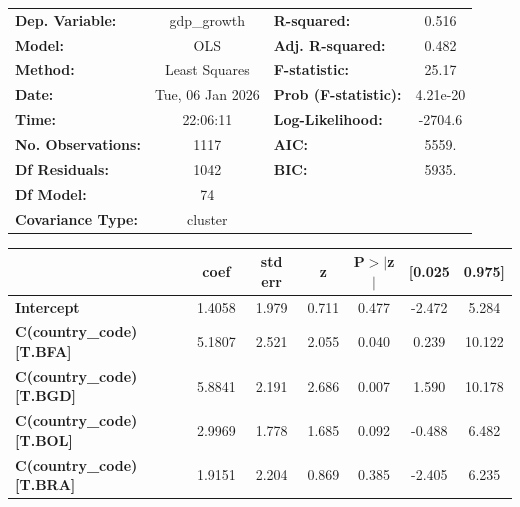\begin{center}
\begin{tabular}{lclc}
\toprule
\textbf{Dep. Variable:}          &   gdp\_growth    & \textbf{  R-squared:         } &     0.516   \\
\textbf{Model:}                  &       OLS        & \textbf{  Adj. R-squared:    } &     0.482   \\
\textbf{Method:}                 &  Least Squares   & \textbf{  F-statistic:       } &     25.17   \\
\textbf{Date:}                   & Tue, 06 Jan 2026 & \textbf{  Prob (F-statistic):} &  4.21e-20   \\
\textbf{Time:}                   &     22:06:11     & \textbf{  Log-Likelihood:    } &   -2704.6   \\
\textbf{No. Observations:}       &        1117      & \textbf{  AIC:               } &     5559.   \\
\textbf{Df Residuals:}           &        1042      & \textbf{  BIC:               } &     5935.   \\
\textbf{Df Model:}               &          74      & \textbf{                     } &             \\
\textbf{Covariance Type:}        &     cluster      & \textbf{                     } &             \\
\bottomrule
\end{tabular}
\begin{tabular}{lcccccc}
                                 & \textbf{coef} & \textbf{std err} & \textbf{z} & \textbf{P$> |$z$|$} & \textbf{[0.025} & \textbf{0.975]}  \\
\midrule
\textbf{Intercept}               &       1.4058  &        1.979     &     0.711  &         0.477        &       -2.472    &        5.284     \\
\textbf{C(country\_code)[T.BFA]} &       5.1807  &        2.521     &     2.055  &         0.040        &        0.239    &       10.122     \\
\textbf{C(country\_code)[T.BGD]} &       5.8841  &        2.191     &     2.686  &         0.007        &        1.590    &       10.178     \\
\textbf{C(country\_code)[T.BOL]} &       2.9969  &        1.778     &     1.685  &         0.092        &       -0.488    &        6.482     \\
\textbf{C(country\_code)[T.BRA]} &       1.9151  &        2.204     &     0.869  &         0.385        &       -2.405    &        6.235     \\

\end{tabular}
\end{center}
